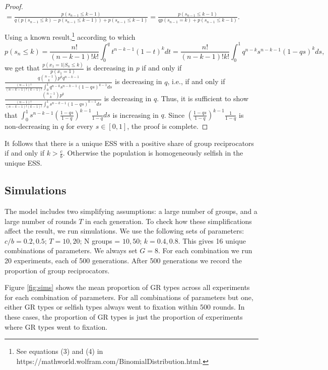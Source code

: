 \documentclass[12pt,a4paper]{article}
\begin{document}
\begin{proof}
\vspace{0.3cm}
$=\frac{p(s_{n-1} \leq k-1)}{q(p(s_{n-1} \leq k)-p(s_{n-1} \leq k-1))+p(s_{n-1} \leq k-1)}=\frac{p(s_{n-1} \leq k-1)}{qp(s_{n-1}=k)+p(s_{n-1} \leq k-1)}.$
\vspace{0.3cm}

Using a known result,\footnote{See equations (3) and (4) in https://mathworld.wolfram.com/BinomialDistribution.html.} according to which
\begin{equation*}
    p(s_n \leq k) = \frac{n!}{(n-k-1)!k!}\int_0^q t^{n-k-1}(1-t)^k dt = \frac{n!}{(n-k-1)!k!}\int_0^1 q^{n-k} s^{n-k-1} (1-qs)^k ds,
\end{equation*}
we get that $\frac{p(x_1=1|S_n \leq k)}{p(x_1=1)}$ is decreasing in $p$ if and only if $\frac{q \binom{n-1}{k} p^k q^{n-k-1}}{\frac{(n-1)!}{(n-k-1)!(k-1)!}\int_0^1 q^{n-k}s^{n-k-1}(1-qs)^{k-1} ds}$ is decreasing in $q$, i.e., if and only if $\frac{\binom{n-1}{k} p^k}{\frac{(n-1)!}{(n-k-1)!(k-1)!}\int_0^1 s^{n-k-1}(1-qs)^{k-1} ds}$ is decreasing in $q$.
\vspace{0.3cm}
Thus, it is sufficient to show that $\int_0^1 s^{n-k-1}(\frac{1-qs}{1-q})^{k-1}\frac{1}{1-q} ds$ is increasing in $q$. Since $(\frac{1-qs}{1-q})^{k-1}\frac{1}{1-q}$ is non-decreasing in $q$ for every $s \in [0,1]$, the proof is complete.

\end{proof}
%
It follows that there is a unique ESS with a positive share of group
reciprocators if and only if $k > \frac{c}{b}$. Otherwise the population is homogeneously selfish in the unique ESS.

\subsection{Simulations}

The model includes two simplifying assumptions: a large number of groups, and a large
number of rounds $T$ in each generation. To check how these simplifications affect
the result, we run simulations. We use the following sets of parameters:
$c/b = 0.2, 0.5$; $T = 10, 20$; N groups = $10, 50$; $k = 0.4, 0.8$. This gives
16 unique combinations of parameters. We always set $G = 8$.
For each combination we run 20 experiments, each of 500 generations. After
500 generations we record the proportion of group reciprocators. 

Figure \ref{fig:sims} shows the mean proportion of GR types across all experiments for
each combination of parameters. For all combinations of parameters but one,
either GR types or selfish types always went to fixation within 500 rounds. In
these cases, the proportion of GR types is just the proportion of experiments
where GR types went to fixation.
\end{document}
